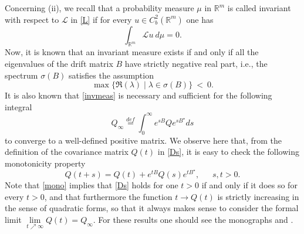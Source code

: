 \documentclass[11pt,a4paper]{amsart}
\newcommand{\Rm}{\mathbb R^m}
\numberwithin{equation}{section}
\numberwithin{equation}{section}
\begin{document}
Concerning (ii), we recall  that a probability measure $\mu$ in $\Rm$ is called invariant with respect to $\mathscr L$ in \eqref{L} if for every $u\in C^2_b(\Rm)$ one has
\[
\int_{\Rm} \mathscr L u\ d\mu = 0.
\]
Now, it is known that an invariant measure exists if and only if all the eigenvalues of the drift matrix $B$ have strictly negative real part, i.e.,  
 the spectrum $\sigma(B)$ satisfies the assumption
\begin{equation}\label{invmeas}
\max\{\Re(\lambda)\mid \lambda\in \sigma(B)\}\ <\ 0.
\end{equation}  
It is also known that \eqref{invmeas} is necessary and sufficient for the following integral
\begin{equation}\label{measure}
Q_\infty \overset{def}{=}\int_0^\infty e^{sB} Q e^{s B^\star} ds
\end{equation}
to converge to a well-defined positive matrix. 
We observe here that, from the definition of the covariance matrix $Q(t)$ in \eqref{Ds}, it is easy to check the following monotonicity property  
\begin{equation}\label{mono}
Q(t+s) = Q(t) + e^{tB} Q(s) e^{tB^\star},\ \ \ \ \ \ \ s, t >0.
\end{equation}
Note that \eqref{mono} implies that \eqref{Ds} holds for one $t>0$ if and only if it does so for every $t>0$, and that furthermore the function $t\to Q(t)$ is strictly increasing in the sense of quadratic forms, so that it always makes sense to consider the formal limit $\underset{t\nearrow \infty}{\lim} Q(t) = Q_\infty$. For these results one should see the monographs \cite[Section 6]{DZ} and \cite{Bo}. 
\end{document}
